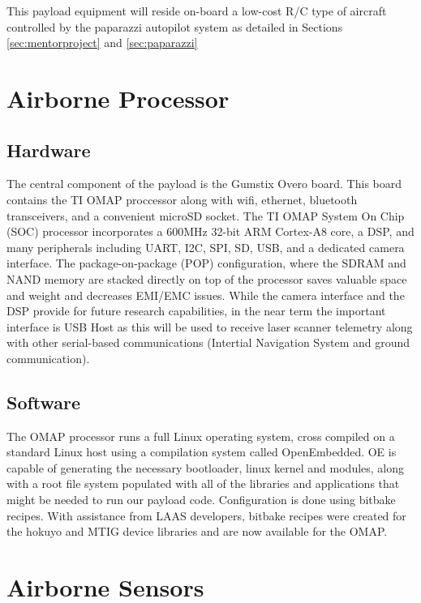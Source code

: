\documentclass[a4paper,11pt]{report}
\begin{document}
This payload equipment will reside on-board a low-cost R/C type of aircraft controlled by the paparazzi autopilot system as detailed in Sections \ref{sec:mentorproject} and \ref{sec:paparazzi}

\section{Airborne Processor}
\label{sec:AirborneProcessor}

\subsection{Hardware}

The central component of the payload is the Gumstix Overo board. This board contains the TI OMAP proccessor along with wifi, ethernet, bluetooth transceivers, and a convenient microSD socket. The TI OMAP System On Chip (SOC) processor incorporates a 600MHz 32-bit ARM Cortex-A8 core, a DSP, and many peripherals including UART, I2C, SPI, SD, USB, and a dedicated camera interface. The package-on-package (POP) configuration, where the SDRAM and NAND memory are stacked directly on top of the processor saves valuable space and weight and decreases EMI/EMC issues. While the camera interface and the DSP provide for future research capabilities, in the near term the important interface is USB Host as this will be used to receive laser scanner telemetry along with other serial-based communications (Intertial Navigation System and ground communication).

\subsection{Software}

The OMAP processor runs a full Linux operating system, cross compiled on a standard Linux host using a compilation system called OpenEmbedded. OE is capable of generating the necessary bootloader, linux kernel and modules, along with a root file system populated with all of the libraries and applications that might be needed to run our payload code. Configuration is done using bitbake recipes. With assistance from LAAS developers, bitbake recipes were created for the hokuyo and MTIG device libraries and are now available for the OMAP.

\section{Airborne Sensors}
\end{document}
